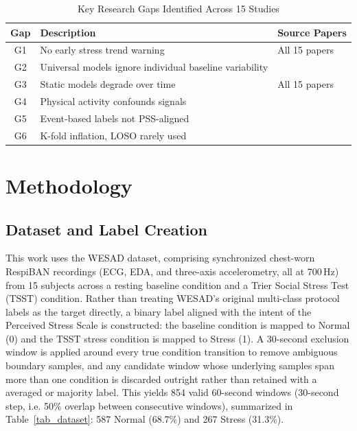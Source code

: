 \documentclass[conference]{IEEEtran}
\begin{document}
\begin{table}[htbp]
\caption{Key Research Gaps Identified
Across 15 Studies}
\begin{center}
\begin{tabular}{|c|p{3.5cm}|p{2.5cm}|}
\hline
\textbf{Gap} &
\textbf{Description} &
\textbf{Source Papers} \\
\hline
G1 & No early stress trend warning &
All 15 papers \\
G2 & Universal models ignore individual
baseline variability &
\cite{b1}\cite{b4}\cite{b8}\cite{b10} \\
G3 & Static models degrade over time &
All 15 papers \\
G4 & Physical activity confounds signals &
\cite{b1}\cite{b4}\cite{b5}\cite{b8} \\
G5 & Event-based labels not PSS-aligned &
\cite{b1}\cite{b4}\cite{b5}\cite{b9} \\
G6 & K-fold inflation, LOSO rarely used &
\cite{b7}\cite{b15} \\
\hline
\end{tabular}
\label{tab_gaps}
\end{center}
\end{table}

\section{Methodology}

\subsection{Dataset and Label Creation}
This work uses the WESAD dataset, comprising synchronized
chest-worn RespiBAN recordings (ECG, EDA, and three-axis
accelerometry, all at 700\,Hz) from 15 subjects across a
resting baseline condition and a Trier Social Stress Test
(TSST) condition. Rather than treating WESAD's original
multi-class protocol labels as the target directly, a binary
label aligned with the intent of the Perceived Stress Scale
is constructed: the baseline condition is mapped to Normal
(0) and the TSST stress condition is mapped to Stress (1). A
30-second exclusion window is applied around every true
condition transition to remove ambiguous boundary samples,
and any candidate window whose underlying samples span more
than one condition is discarded outright rather than
retained with a averaged or majority label. This yields 854
valid 60-second windows (30-second step, i.e. 50\% overlap
between consecutive windows), summarized in
Table~\ref{tab_dataset}: 587 Normal (68.7\%) and 267 Stress
(31.3\%).
\end{document}
